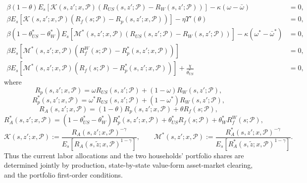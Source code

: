 \documentclass{article}
\begin{document}
\begin{align}
\beta(1-\theta)
E_s\!\left[\mathcal K(s,z';x,\mathcal P)
(R_{US}(s,z';\mathcal P)-R_W(s,z';\mathcal P))\right]
-\kappa(\omega-\bar\omega)&=0,
\label{intratemporal_omega_US}\\
\beta
E_s\!\left[\mathcal K(s,z';x,\mathcal P)
(R_f(s;\mathcal P)-R_p(s,z';x,\mathcal P))\right]
-\eta\Upsilon'(\theta)&=0,
\label{intratemporal_theta_US}\\
\beta(1-\theta_{US}^*-\theta_W^*)
E_s\!\left[\mathcal M^*(s,z';x,\mathcal P)
(R_{US}(s,z';\mathcal P)-R_W(s,z';\mathcal P))\right]
-\kappa(\omega^*-\bar\omega^*)&=0,
\label{intratemporal_omega_W}\\
\beta E_s\!\left[\mathcal M^*(s,z';x,\mathcal P)
(R_f^W(s;\mathcal P)-R_p^*(s,z';x,\mathcal P))\right]&=0,
\label{intratemporal_thetaW}\\
\beta E_s\!\left[\mathcal M^*(s,z';x,\mathcal P)
(R_f(s;\mathcal P)-R_p^*(s,z';x,\mathcal P))\right]
+\frac{\chi}{\theta_{US}^*}&=0,
\label{intratemporal_thetaUS}
\end{align}
where
\[
R_p(s,z';x,\mathcal P)=\omega R_{US}(s,z';\mathcal P)+(1-\omega)R_W(s,z';\mathcal P),
\]
\[
R_p^*(s,z';x,\mathcal P)=\omega^*R_{US}(s,z';\mathcal P)+(1-\omega^*)R_W(s,z';\mathcal P),
\]
\[
R_A(s,z';x,\mathcal P)=(1-\theta)R_p(s,z';x,\mathcal P)+\theta R_f(s;\mathcal P),
\]
\[
R_A^*(s,z';x,\mathcal P)
=(1-\theta_{US}^*-\theta_W^*)R_p^*(s,z';x,\mathcal P)
+\theta_{US}^*R_f(s;\mathcal P)+\theta_W^*R_f^W(s;\mathcal P),
\]
\[
\mathcal K(s,z';x,\mathcal P)
:=
\frac{R_A(s,z';x,\mathcal P)^{-\gamma}}
{E_s\!\left[R_A(s,\tilde z;x,\mathcal P)^{1-\gamma}\right]},
\qquad
\mathcal M^*(s,z';x,\mathcal P)
:=
\frac{R_A^*(s,z';x,\mathcal P)^{-\gamma}}
{E_s\!\left[R_A^*(s,\tilde z;x,\mathcal P)^{1-\gamma}\right]}.
\]
Thus the current labor allocations and the two households' portfolio shares are determined jointly by production, state-by-state value-form asset-market clearing, and the portfolio first-order conditions.
\end{document}
